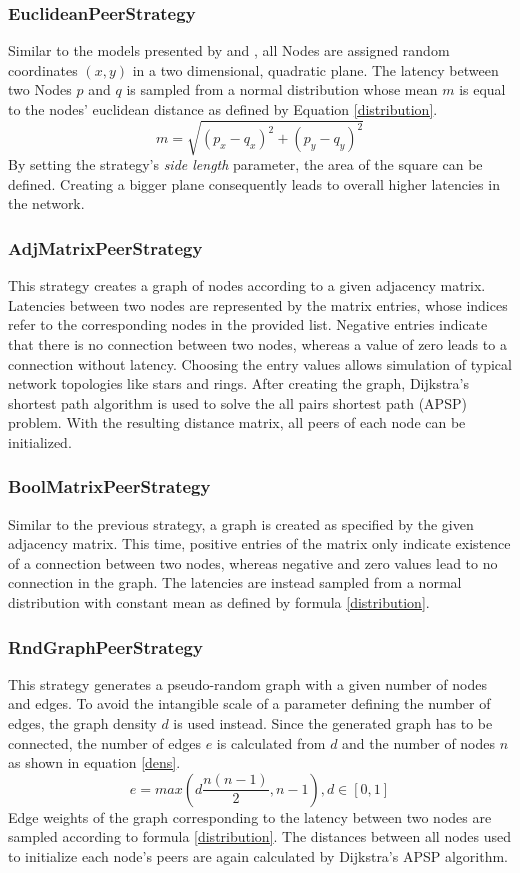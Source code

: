 \documentclass[a4paper,12pt,twoside]{report}
\begin{document}
\subsubsection{EuclideanPeerStrategy}
Similar to the models presented by \cite{mwalemodel} and \cite{selfishmine2}, all Nodes are assigned random coordinates $(x,y)$ in a two dimensional, quadratic plane. The latency between two Nodes $p$ and $q$ is sampled from a normal distribution whose mean $m$ is equal to the nodes' euclidean distance as defined by Equation \ref{distribution}.
\begin{equation}\label{euclid}
m = \sqrt{(p_{x}-q_{x})^{2}+(p_{y}-q_{y})^{2}}
\end{equation}
By setting the strategy's \textit{side length} parameter, the area of the square can be defined. Creating a bigger plane consequently leads to overall higher latencies in the network.
\subsubsection{AdjMatrixPeerStrategy}
This strategy creates a graph of nodes according to a given adjacency matrix. Latencies between two nodes are represented by the matrix entries, whose indices refer to the corresponding nodes in the provided list. Negative entries indicate that there is no connection between two nodes, whereas a value of zero leads to a connection without latency. Choosing the entry values allows simulation of typical network topologies like stars and rings. After creating the graph, Dijkstra's shortest path algorithm is used to solve the all pairs shortest path (APSP) problem. With the resulting distance matrix, all peers of each node can be initialized.
\subsubsection{BoolMatrixPeerStrategy}
Similar to the previous strategy, a graph is created as specified by the given adjacency matrix. This time, positive entries of the matrix only indicate existence of a connection between two nodes, whereas negative and zero values lead to no connection in the graph. The latencies are instead sampled from a normal distribution with constant mean as defined by formula \ref{distribution}.
\subsubsection{RndGraphPeerStrategy} \label{rndgraphstrategy}
This strategy generates a pseudo-random graph with a given number of nodes and edges. To avoid the intangible scale of a parameter defining the number of edges, the graph density $d$ is used instead. Since the generated graph has to be connected, the number of edges $e$ is calculated from $d$ and the number of nodes $n$ as shown in equation \ref{dens}. 
\begin{equation}\label{dens}
e = max \left( d\frac{n\left( n-1\right) }{2}, n-1 \right), d\in [0,1]
\end{equation}
Edge weights of the graph corresponding to the latency between two nodes are sampled according to formula \ref{distribution}. The distances between all nodes used to initialize each node's peers are again calculated by Dijkstra's APSP algorithm. 
\end{document}

